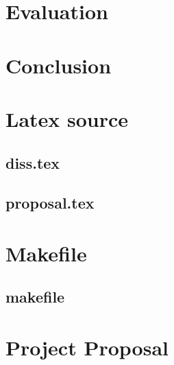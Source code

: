 \documentclass[12pt,a4paper,twoside,openright]{report}
\begin{document}
\chapter{Evaluation}


\chapter{Conclusion}





\appendix

\chapter{Latex source}

\section{diss.tex}
{\scriptsize}

\section{proposal.tex}
{\scriptsize}

\chapter{Makefile}

\section{makefile}\label{makefile}



\chapter{Project Proposal}

%
\end{document}
